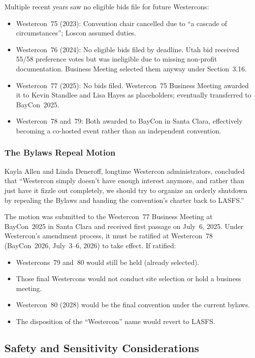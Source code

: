 \documentclass[11pt,letterpaper]{article}
\begin{document}
Multiple recent years saw no eligible bids file for future Westercons:
\begin{itemize}[leftmargin=2em]
  \item Westercon~75 (2023): Convention chair cancelled due to ``a cascade of circumstances''; Loscon assumed duties.
  \item Westercon~76 (2024): No eligible bids filed by deadline. Utah bid received 55/58 preference votes but was ineligible due to missing non-profit documentation. Business Meeting selected them anyway under Section~3.16.
  \item Westercon~77 (2025): No bids filed. Westercon~75 Business Meeting awarded it to Kevin Standlee and Lisa Hayes as placeholders; eventually transferred to BayCon~2025.
  \item Westercon~78 and~79: Both awarded to BayCon in Santa Clara, effectively becoming a co-hosted event rather than an independent convention.
\end{itemize}

\subsubsection{The Bylaws Repeal Motion}

Kayla Allen and Linda Deneroff, longtime Westercon administrators, concluded that ``Westercon simply doesn't have enough interest anymore, and rather than just have it fizzle out completely, we should try to organize an orderly shutdown by repealing the Bylaws and handing the convention's charter back to LASFS.''

The motion was submitted to the Westercon~77 Business Meeting at BayCon~2025 in Santa Clara and received first passage on July~6, 2025. Under Westercon's amendment process, it must be ratified at Westercon~78 (BayCon~2026, July~3--6, 2026) to take effect. If ratified:
\begin{itemize}[leftmargin=2em]
  \item Westercons~79 and~80 would still be held (already selected).
  \item Those final Westercons would not conduct site selection or hold a business meeting.
  \item Westercon~80 (2028) would be the final convention under the current bylaws.
  \item The disposition of the ``Westercon'' name would revert to LASFS.
\end{itemize}

\subsection{Safety and Sensitivity Considerations}
\end{document}
